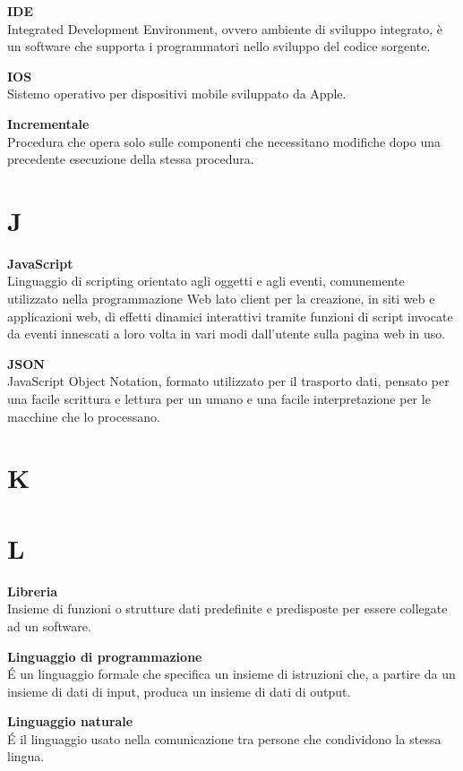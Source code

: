 \documentclass[a4paper, oneside, openany, dvipsnames, table, 12pt]{article}
\begin{document}
\textbf{IDE} \\
Integrated Development Environment, ovvero ambiente di sviluppo integrato, è un software che supporta i programmatori nello sviluppo del codice sorgente. 

\textbf{IOS} \\
Sistemo operativo per dispositivi mobile sviluppato da Apple.

\textbf{Incrementale} \\
Procedura che opera solo sulle componenti che necessitano modifiche dopo una precedente esecuzione della stessa procedura.

\newpage
\section{J}
\textbf{JavaScript}\\	
Linguaggio di scripting orientato agli oggetti e agli eventi, comunemente utilizzato nella programmazione Web lato client per la creazione, in siti web e applicazioni web, di effetti dinamici interattivi tramite funzioni di script invocate da eventi innescati a loro volta in vari modi dall'utente sulla pagina web in uso.

\textbf{JSON} \\
JavaScript Object Notation, formato utilizzato per il trasporto dati, pensato
per una facile scrittura e lettura per un umano e una facile interpretazione per
le macchine che lo processano.

\newpage
\section{K}

\newpage
\section{L}
\textbf{Libreria} \\
Insieme di funzioni o strutture dati predefinite e predisposte per essere collegate ad un software. 

\textbf{Linguaggio di programmazione} \\
\'E un linguaggio formale che specifica un insieme di istruzioni che, a partire da un insieme di dati di input, produca un insieme di dati di output.

\textbf{Linguaggio naturale} \\
\'E il linguaggio usato nella comunicazione tra persone che condividono la stessa lingua.
\end{document}
